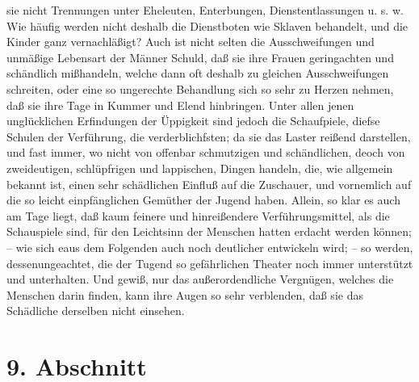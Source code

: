 sie nicht Trennungen unter Eheleuten, Enterbungen, Dienstentlassungen u. s. w.
Wie häufig werden nicht deshalb die Dienstboten wie Sklaven behandelt, und die
Kinder ganz vernachläßigt? Auch ist nicht selten die Ausschweifungen und
unmäßige Lebensart der Männer Schuld, daß sie ihre Frauen geringachten und
schändlich mißhandeln, welche dann oft deshalb zu gleichen Ausschweifungen
schreiten, oder eine so ungerechte Behandlung sich so sehr zu Herzen nehmen, daß
sie ihre Tage in Kummer und Elend hinbringen. Unter allen jenen unglücklichen
Erfindungen der Üppigkeit sind jedoch die Schaufpiele, diefse Schulen der
Verführung, die verderblichfsten; da sie das Laster reißend darstellen, und fast
immer, wo nicht von offenbar schmutzigen und schändlichen, deoch von
zweideutigen, schlüpfrigen und lappischen, Dingen handeln, die, wie allgemein
bekannt ist, einen sehr schädlichen Einfluß auf die Zuschauer, und vornemlich
auf die so leicht einpfänglichen Gemüther der Jugend haben. Allein, so klar es
auch am Tage liegt, daß kaum feinere und hinreißendere Verführungsmittel, als
die Schauspiele sind, für den Leichtsinn der Menschen hatten erdacht werden
können; -- wie sich eaus dem Folgenden auch noch deutlicher entwickeln wird; --
so werden, dessenungeachtet, die der Tugend so gefährlichen Theater noch immer
unterstützt und unterhalten. Und gewiß, nur das außerordendliche Vergnügen,
welches die Menschen darin finden, kann ihre Augen so sehr verblenden, daß sie
das Schädliche derselben nicht einsehen.

\section{9. Abschnitt}

